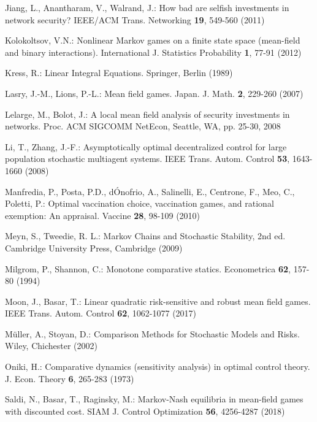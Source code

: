 \begin{thebibliography}{99.}
Jiang, L., Anantharam, V., Walrand, J.:
How bad are selfish investments in network security?
 IEEE/ACM Trans. Networking \textbf{19}, 549-560 (2011)


Kolokoltsov, V.N.:
Nonlinear Markov games on a finite state space (mean-field and
binary interactions).
International J. Statistics Probability \textbf{1}, 77-91 (2012)




Kress, R.: Linear Integral Equations. Springer, Berlin (1989)




Lasry, J.-M., Lions, P.-L.: Mean field games. Japan. J.
Math. \textbf{2}, 229-260 (2007)



Lelarge, M., Bolot, J.: A local mean field analysis of security investments
in networks. Proc. ACM SIGCOMM NetEcon, Seattle, WA, pp. 25-30,
 2008


Li, T., Zhang, J.-F.: Asymptotically optimal decentralized control
for large population stochastic multiagent systems. IEEE Trans.
Autom. Control \textbf{53}, 1643-1660 (2008)





Manfredia, P., Posta, P.D., d\'Onofrio, A., Salinelli, E., Centrone, F., Meo, C., Poletti, P.:
Optimal vaccination choice, vaccination games, and rational exemption:
An appraisal.  Vaccine \textbf{28}, 98-109 (2010)


Meyn, S., Tweedie, R. L.: Markov Chains and Stochastic Stability, 2nd ed. Cambridge University Press, Cambridge (2009)


Milgrom, P., Shannon, C.:  Monotone comparative statics. Econometrica \textbf{62}, 157-80 (1994)


Moon, J.,  Basar, T.: Linear quadratic risk-sensitive and robust mean field games. IEEE
Trans. Autom. Control \textbf{62},  1062-1077 (2017)


M\"uller, A., Stoyan, D.: Comparison Methods for Stochastic Models and Risks.
Wiley, Chichester (2002)




Oniki, H.: Comparative dynamics (sensitivity analysis) in optimal control theory.
J. Econ. Theory \textbf{6}, 265-283 (1973)


Saldi, N., Basar, T., Raginsky, M.:
Markov-Nash equilibria in mean-field games with discounted cost.
SIAM J. Control Optimization \textbf{56}, 4256-4287 (2018)




\end{thebibliography}
